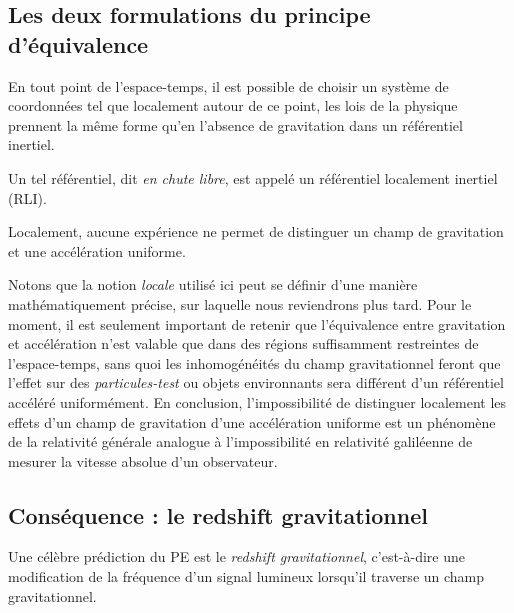 \subsection{Les deux formulations du principe d'équivalence}
\label{sec:PE2}
\begin{theoremframe}
    \begin{propri}
        En tout point de l'espace-temps, il est possible de choisir un système de coordonnées tel que localement autour de ce point, les lois de la physique prennent la même forme qu'en l'absence de gravitation dans un référentiel inertiel.
    \end{propri}
\end{theoremframe}
Un tel référentiel, dit \emph{en chute libre}, est appelé un référentiel localement inertiel (RLI).
\begin{theoremframe}
    \begin{propri}
        Localement, aucune expérience ne permet de distinguer un champ de gravitation et une accélération uniforme. 
    \end{propri}
\end{theoremframe}
Notons que la notion \emph{locale} utilisé ici peut se définir d'une manière mathématiquement précise, sur laquelle nous reviendrons plus tard. Pour le moment, il est seulement important de retenir que l'équivalence entre gravitation et accélération n'est valable que dans des régions suffisamment restreintes de l'espace-temps, sans quoi les inhomogénéités du champ gravitationnel feront que l'effet sur des \emph{particules-test} ou objets environnants sera différent d'un référentiel accéléré uniformément.
En conclusion, l'impossibilité de distinguer localement les effets d'un champ de gravitation d'une accélération uniforme est un phénomène de la relativité générale analogue à l'impossibilité en relativité galiléenne de mesurer la vitesse absolue d'un observateur.

\subsection{Conséquence : le redshift gravitationnel}
Une célèbre prédiction du PE est le \emph{redshift gravitationnel}, c’est-à-dire une modification de la fréquence d’un signal lumineux lorsqu’il traverse un champ gravitationnel.
